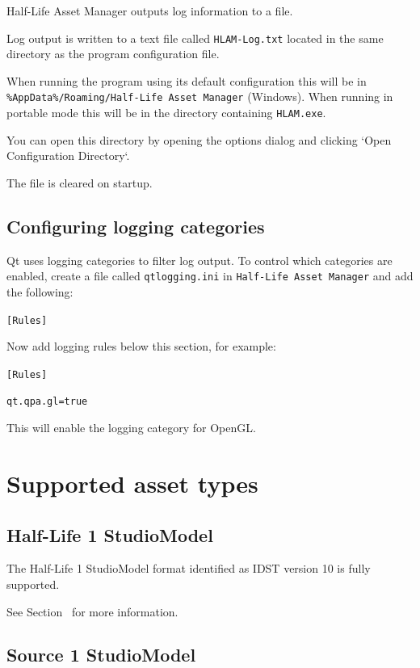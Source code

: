 \documentclass[10pt, a4paper, titlepage, oneside]{article}
\newcommand{\code}[1]{\mbox{\texttt{#1}}}
\begin{document}
Half-Life Asset Manager outputs log information to a file.

Log output is written to a text file called \code{HLAM-Log.txt} located in the same directory as the program configuration file.

When running the program using its default configuration this will be in \code{\%AppData\%/Roaming/Half-Life Asset Manager} (Windows).
When running in portable mode this will be in the directory containing \code{HLAM.exe}.

You can open this directory by opening the options dialog and clicking `Open Configuration Directory`.

The file is cleared on startup.

\subsection{Configuring logging categories}

Qt uses logging categories to filter log output. To control which categories are enabled, create a file called \code{qtlogging.ini} in \code{Half-Life Asset Manager} and add the following:

\code{[Rules]}

Now add logging rules below this section, for example:

\code{[Rules]}

\code{qt.qpa.gl=true}

This will enable the logging category for OpenGL.

\newpage

\section{Supported asset types}
\label{sec:supported_asset_types}

\subsection{Half-Life 1 StudioModel}

The Half-Life 1 StudioModel format identified as IDST version 10 is fully supported.

See Section~ for more information.

\subsection{Source 1 StudioModel}
\end{document}
